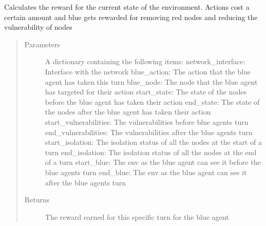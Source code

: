 \documentclass[letterpaper,10pt,english]{sphinxmanual}
\begin{document}
\begin{fulllineitems}
\label{\detokenize{source/yawning_titan.envs.generic.core:yawning_titan.envs.generic.core.reward_functions.experimental_rewards}}
\sphinxAtStartPar
Calculates the reward for the current state of the environment. Actions cost a certain amount and blue gets rewarded
for removing red nodes and reducing the vulnerability of nodes
\begin{quote}\begin{description}
\item[{Parameters}] \leavevmode
\sphinxAtStartPar
{} \textendash{} A dictionary containing the following items:
network\_interface: Interface with the network
blue\_action: The action that the blue agent has taken this turn
blue\_node: The node that the blue agent has targeted for their action
start\_state: The state of the nodes before the blue agent has taken their action
end\_state: The state of the nodes after the blue agent has taken their action
start\_vulnerabilities: The vulnerabilities before blue agents turn
end\_vulnerabilities: The vulnerabilities after the blue agents turn
start\_isolation: The isolation status of all the nodes at the start of a turn
end\_isolation: The isolation status of all the nodes at the end of a turn
start\_blue: The env as the blue agent can see it before the blue agents turn
end\_blue: The env as the blue agent can see it after the blue agents turn

\item[{Returns}] \leavevmode
\sphinxAtStartPar
The reward earned for this specific turn for the blue agent

\end{description}\end{quote}

\end{fulllineitems}

\end{document}
